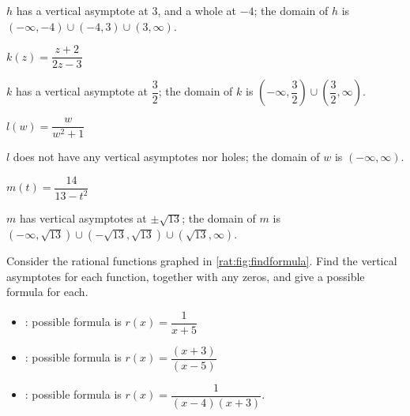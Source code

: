 \begin{exercises}
\begin{problem}
\begin{multicols}{3}
\begin{subproblem}
\begin{shortsolution}
 				$h$ has a vertical asymptote at $3$, and a whole at $-4$; the domain of $h$ is $(-\infty,-4)\cup(-4,3)\cup(3,\infty)$.
 			\end{shortsolution}
 		\end{subproblem}
 		\begin{subproblem}
 			$k(z)=\dfrac{z+2}{2z-3}$
 			\begin{shortsolution}
 				$k$ has a vertical asymptote at $\dfrac{3}{2}$; the domain of $k$ is $\left( -\infty,\dfrac{3}{2} \right)\cup\left( \dfrac{3}{2},\infty \right)$.
 			\end{shortsolution}
 		\end{subproblem}
 		\begin{subproblem}
 			$l(w)=\dfrac{w}{w^2+1}$
 			\begin{shortsolution}
 				$l$ does not have any vertical asymptotes nor holes; the domain of $w$ is $(-\infty,\infty)$.
 			\end{shortsolution}
 		\end{subproblem}
 		\begin{subproblem}
 			$m(t)=\dfrac{14}{13-t^2}$
 			\begin{shortsolution}
 				$m$ has vertical asymptotes at $\pm\sqrt{13}$; the domain of $m$ is $(-\infty,\sqrt{13})\cup(-\sqrt{13},\sqrt{13})\cup(\sqrt{13},\infty)$.
 			\end{shortsolution}
 		\end{subproblem}
 	\end{multicols}
 	\end{problem}

 	\begin{problem}
 	Consider the rational functions graphed in \cref{rat:fig:findformula}. Find
 	the vertical asymptotes for each function, together with any zeros, and
 	give a possible formula for each.
 	\begin{shortsolution}
 		\begin{itemize}
 			\item {}: possible formula is $r(x)=\dfrac{1}{x+5}$
 			\item {}: possible formula is $r(x)=\dfrac{(x+3)}{(x-5)}$
 			\item {}: possible formula is $r(x)=\dfrac{1}{(x-4)(x+3)}$.
 		\end{itemize}
 	\end{shortsolution}
 	\end{problem}


\end{exercises}
